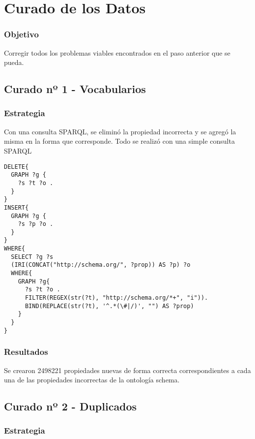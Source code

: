 \chapter{Curado de los Datos}
\label{chapter:curado}

\subsection*{Objetivo}
Corregir todos los problemas viables encontrados en el paso anterior que se pueda.

\section{Curado nº 1 - Vocabularios}
\label{section:curado-vocabularios}

\subsection*{Estrategia}
Con una consulta SPARQL, se eliminó la propiedad incorrecta y se agregó la misma en la forma que corresponde.
Todo se realizó con una simple consulta SPARQL

\newpage
\begin{lstlisting}[frame=single]  
DELETE{
  GRAPH ?g {
    ?s ?t ?o .
  }
}
INSERT{
  GRAPH ?g {
    ?s ?p ?o .
  }
}
WHERE{
  SELECT ?g ?s 
  (IRI(CONCAT("http://schema.org/", ?prop)) AS ?p) ?o
  WHERE{
    GRAPH ?g{
      ?s ?t ?o .
      FILTER(REGEX(str(?t), "http://schema.org/*+", "i")).
      BIND(REPLACE(str(?t), '^.*(\#|/)', "") AS ?prop)
    }
  }
}
\end{lstlisting}


\subsection*{Resultados}
Se crearon 2498221 propiedades nuevas de forma correcta correspondientes a cada una de las propiedades incorrectas de la ontología 
schema.

\section{Curado nº 2 - Duplicados}
\label{section:curado-duplicados}

\subsection*{Estrategia}

